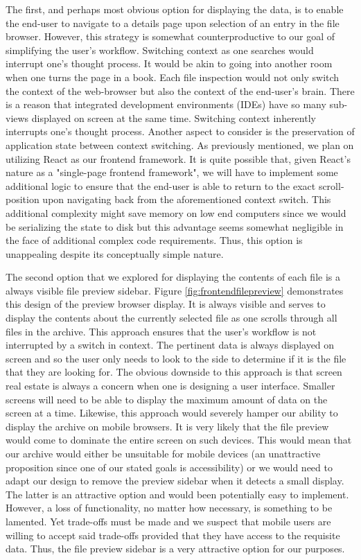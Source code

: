 \documentclass[12pt]{report}
\begin{document}
The first, and perhaps most obvious option for displaying the data, is to enable the end-user to navigate to a details page upon selection of an entry in the file browser. However, this strategy is somewhat counterproductive to our goal of simplifying the user's workflow. Switching context as one searches would interrupt one's thought process. It would be akin to going into another room when one turns the page in a book. Each file inspection would not only switch the context of the web-browser but also the context of the end-user's brain. There is a reason that integrated development environments (IDEs) have so many sub-views displayed on screen at the same time. Switching context inherently interrupts one's thought process. Another aspect to consider is the preservation of application state between context switching. As previously mentioned, we plan on utilizing React as our frontend framework. It is quite possible that, given React's nature as a "single-page frontend framework", we will have to implement some additional logic to ensure that the end-user is able to return to the exact scroll-position upon navigating back from the aforementioned context switch. This additional complexity might save memory on low end computers since we would be serializing the state to disk but this advantage seems somewhat negligible in the face of additional complex code requirements. Thus, this option is unappealing despite its conceptually simple nature.

The second option that we explored for displaying the contents of each file is a always visible file preview sidebar. Figure \ref{fig:frontendfilepreview} demonstrates this design of the preview browser display. It is always visible and serves to display the contents about the currently selected file as one scrolls through all files in the archive. This approach ensures that the user's workflow is not interrupted by a switch in context. The pertinent data is always displayed on screen and so the user only needs to look to the side to determine if it is the file that they are looking for. The obvious downside to this approach is that screen real estate is always a concern when one is designing a user interface. Smaller screens will need to be able to display the maximum amount of data on the screen at a time. Likewise, this approach would severely hamper our ability to display the archive on mobile browsers. It is very likely that the file preview would come to dominate the entire screen on such devices. This would mean that our archive would either be unsuitable for mobile devices (an unattractive proposition since one of our stated goals is accessibility) or we would need to adapt our design to remove the preview sidebar when it detects a small display. The latter is an attractive option and would been potentially easy to implement. However, a loss of functionality, no matter how necessary, is something to be lamented. Yet trade-offs must be made and we suspect that mobile users are willing to accept said trade-offs provided that they have access to the requisite data. Thus, the file preview sidebar is a very attractive option for our purposes.
\end{document}
